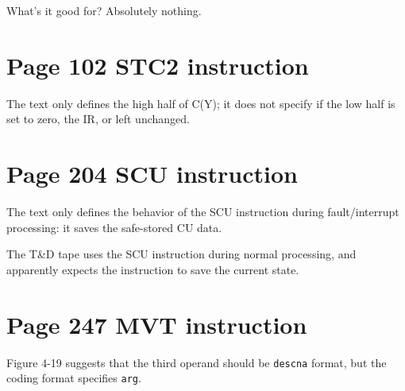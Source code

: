 \documentclass[notitlepage]{report}
\begin{document}
What's it good for? Absolutely nothing.

\section{Page 102 STC2 instruction}

The text only defines the high half of C(Y); it does not specify if the low half is set to zero, the IR, or left unchanged.

\section{Page 204 SCU instruction}

The text only defines the behavior of the SCU instruction during fault/interrupt processing: it saves the safe-stored CU data.

The T\&D tape uses the SCU instruction during normal processing, and apparently
expects the instruction to save the current state.

\section{Page 247 MVT instruction}

Figure 4-19 suggests that the third operand should be \texttt{descna} format, 
but the coding format specifies \texttt{arg}.
\end{document}
